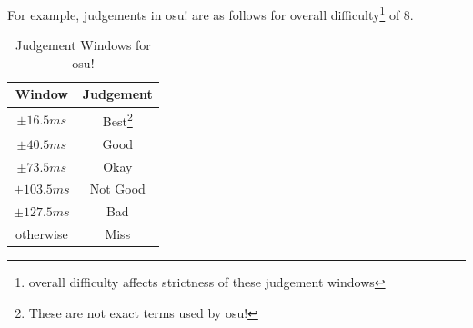 For example, judgements in osu!
are as follows for overall difficulty\footnote{overall difficulty affects strictness of these judgement windows} of 8.
\begin{table}[H]
    \centering
    \begin{tabular}{c|c}
        Window       & Judgement                                             \\  \hline
        $\pm16.5ms$  & Best\footnote{These are not exact terms used by osu!} \\
        $\pm40.5ms$  & Good                                                  \\
        $\pm73.5ms$  & Okay                                                  \\
        $\pm103.5ms$ & Not Good                                              \\
        $\pm127.5ms$ & Bad                                                   \\
        otherwise    & Miss                                                  \\
    \end{tabular}
    \caption{Judgement Windows for osu!}
    \label{tab:judgement_osu}
\end{table}

